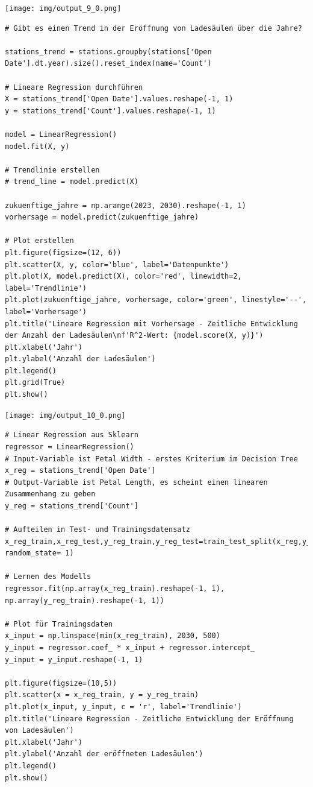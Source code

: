 \begin{center}
\texttt{[image: img/output\_9\_0.png]}
\end{center}

\begin{verbatim}
# Gibt es einen Trend in der Eröffnung von Ladesäulen über die Jahre?

stations_trend = stations.groupby(stations['Open Date'].dt.year).size().reset_index(name='Count')

# Lineare Regression durchführen
X = stations_trend['Open Date'].values.reshape(-1, 1)
y = stations_trend['Count'].values.reshape(-1, 1)

model = LinearRegression()
model.fit(X, y)

# Trendlinie erstellen
# trend_line = model.predict(X)

zukuenftige_jahre = np.arange(2023, 2030).reshape(-1, 1)
vorhersage = model.predict(zukuenftige_jahre)

# Plot erstellen
plt.figure(figsize=(12, 6))
plt.scatter(X, y, color='blue', label='Datenpunkte')
plt.plot(X, model.predict(X), color='red', linewidth=2, label='Trendlinie')
plt.plot(zukuenftige_jahre, vorhersage, color='green', linestyle='--', label='Vorhersage')
plt.title('Lineare Regression mit Vorhersage - Zeitliche Entwicklung der Anzahl der Ladesäulen\nf'R^2-Wert: {model.score(X, y)}')
plt.xlabel('Jahr')
plt.ylabel('Anzahl der Ladesäulen')
plt.legend()
plt.grid(True)
plt.show()
\end{verbatim}

\texttt{[image: img/output\_10\_0.png]}

\begin{verbatim}
# Linear Regression aus Sklearn
regressor = LinearRegression()
# Input-Variable ist Petal Width - erstes Kriterium im Decision Tree
x_reg = stations_trend['Open Date']
# Output-Variable ist Petal Length, es scheint einen linearen Zusammenhang zu geben
y_reg = stations_trend['Count']

# Aufteilen in Test- und Trainingsdatensatz 
x_reg_train,x_reg_test,y_reg_train,y_reg_test=train_test_split(x_reg,y_reg,test_size=0.3, random_state= 1)

# Lernen des Modells
regressor.fit(np.array(x_reg_train).reshape(-1, 1), np.array(y_reg_train).reshape(-1, 1))

# Plot für Trainingsdaten
x_input = np.linspace(min(x_reg_train), 2030, 500)
y_input = regressor.coef_ * x_input + regressor.intercept_
y_input = y_input.reshape(-1, 1)

plt.figure(figsize=(10,5))
plt.scatter(x = x_reg_train, y = y_reg_train)
plt.plot(x_input, y_input, c = 'r', label='Trendlinie')
plt.title('Lineare Regression - Zeitliche Entwicklung der Eröffnung von Ladesäulen')
plt.xlabel('Jahr')
plt.ylabel('Anzahl der eröffneten Ladesäulen')
plt.legend()
plt.show()
\end{verbatim}

